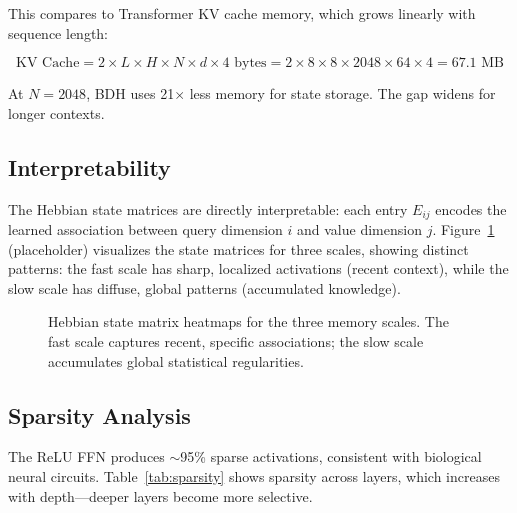 \documentclass{article}
\begin{document}
This compares to Transformer KV cache memory, which grows linearly with sequence length:

\begin{equation}
\text{KV Cache} = 2 \times L \times H \times N \times d \times 4\text{ bytes} = 2 \times 8 \times 8 \times 2048 \times 64 \times 4 = 67.1\text{ MB}
\end{equation}

At $N=2048$, BDH uses 21$\times$ less memory for state storage. The gap widens for longer contexts.

\subsection{Interpretability}

The Hebbian state matrices are directly interpretable: each entry $E_{ij}$ encodes the learned association between query dimension $i$ and value dimension $j$. Figure~\ref{fig:states} (placeholder) visualizes the state matrices for three scales, showing distinct patterns: the fast scale has sharp, localized activations (recent context), while the slow scale has diffuse, global patterns (accumulated knowledge).

\begin{figure}[t]
    \centering
    \caption{Hebbian state matrix heatmaps for the three memory scales. The fast scale captures recent, specific associations; the slow scale accumulates global statistical regularities.}
    \label{fig:states}
\end{figure}

\subsection{Sparsity Analysis}

The ReLU FFN produces $\sim$95\% sparse activations, consistent with biological neural circuits. Table~\ref{tab:sparsity} shows sparsity across layers, which increases with depth---deeper layers become more selective.
\end{document}
